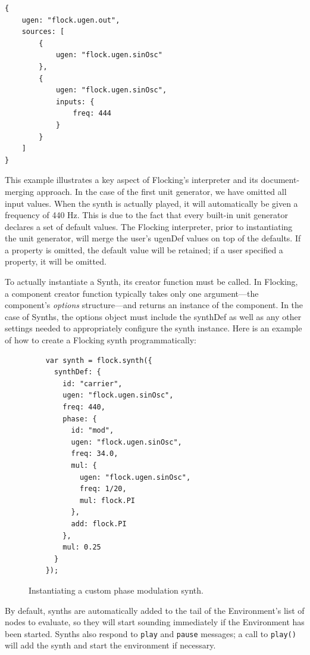 \documentclass{article}
\begin{document}
\begin{verbatim}
{
    ugen: "flock.ugen.out",
    sources: [
        {
            ugen: "flock.ugen.sinOsc"
        },
        {
            ugen: "flock.ugen.sinOsc",
            inputs: {
                freq: 444
            }
        }
    ]
}
\end{verbatim}

This example illustrates a key aspect of Flocking's interpreter and its document-merging approach. In the case of the first unit generator, we have omitted all input values. When the synth is actually played, it will automatically be given a frequency of 440 Hz. This is due to the fact that every built-in unit generator declares a set of default values. The Flocking interpreter, prior to instantiating the unit generator, will merge the user's ugenDef values on top of the defaults. If a property is omitted, the default value will be retained; if a user specified a property, it will be omitted.

To actually instantiate a Synth, its creator function must be called. In Flocking, a component creator function typically takes only one argument---the component's {\it options} structure---and returns an instance of the component. In the case of Synths, the options object must include the synthDef as well as any other settings needed to appropriately configure the synth instance. Here is an example of how to create a Flocking synth programmatically:

\begin{figure}[h!]
    \begin{verbatim}
    var synth = flock.synth({
      synthDef: {
        id: "carrier",
        ugen: "flock.ugen.sinOsc",
        freq: 440,
        phase: {
          id: "mod",
          ugen: "flock.ugen.sinOsc",
          freq: 34.0,
          mul: {
            ugen: "flock.ugen.sinOsc",
            freq: 1/20,
            mul: flock.PI
          },
          add: flock.PI
        },
        mul: 0.25
      }
    });
    \end{verbatim}
    \caption{Instantiating a custom phase modulation synth.\label{fig:pmSynth}}
\end{figure}


By default, synths are automatically added to the tail of the Environment's list of nodes to evaluate, so they will start sounding immediately if the Environment has been started. Synths also respond to \verb|play| and \verb|pause| messages; a call to \verb|play()| will add the synth and start the environment if necessary.
\end{document}
